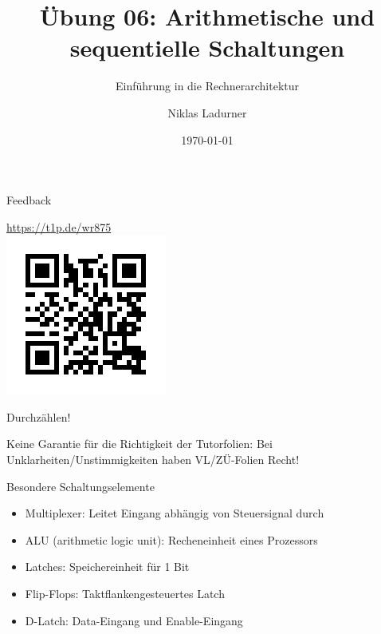 \documentclass[
  german,            %
  aspectratio=169,    %
]{tumbeamer}
\title{Übung 06: Arithmetische und \\sequentielle Schaltungen}
\subtitle{Einführung in die Rechnerarchitektur}
\author{Niklas Ladurner}
\institute{\theChairName\\\theDepartmentName\\\theUniversityName}
\date[\today]{\today}
\begin{document}
\maketitle

\begin{frame}[c]{Feedback}{}
  \begin{center}
    \LARGE  \href{https://t1p.de/wr875}{https://t1p.de/wr875}\\
    \includegraphics[height=0.5\textheight]{feedback_qr.png}
  \end{center}
\end{frame}

\begin{frame}[c]{}{}
  \begin{center}
    \LARGE  Durchzählen!
  \end{center}
\end{frame}

\begin{frame}[c]{}{}
  \begin{center}
    \LARGE  Keine Garantie für die Richtigkeit der Tutorfolien: Bei Unklarheiten/Unstimmigkeiten
    haben VL/ZÜ-Folien Recht!
  \end{center}
\end{frame}

\begin{frame}[fragile, c]{Besondere Schaltungselemente}{}
  \begin{itemize}
    \item Multiplexer: Leitet Eingang abhängig von Steuersignal durch
    \item ALU (arithmetic logic unit): Recheneinheit eines Prozessors
    \item Latches: Speichereinheit für 1 Bit
    \item Flip-Flops: Taktflankengesteuertes Latch
    \item D-Latch: Data-Eingang und Enable-Eingang
  \end{itemize}
\end{frame}
\end{document}
